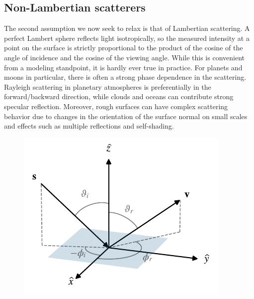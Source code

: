 \documentclass[modern]{aastex62}
\begin{document}
\subsection{Non-Lambertian scatterers}
\label{sec:nonlambertian}

The second assumption we now seek to relax is that of Lambertian
scattering. A perfect Lambert sphere reflects light isotropically, so
the measured intensity at a point on the surface is strictly
proportional to the product of the cosine of the angle of incidence
and the cosine of the viewing angle. While this is convenient
from a modeling standpoint, it is hardly ever true in practice.
For planets and moons in particular, there is often a strong phase
dependence in the scattering. Rayleigh scattering in planetary
atmospheres is preferentially in the forward/backward direction,
while clouds and oceans can contribute strong specular reflection.
Moreover, rough surfaces can have complex scattering behavior due
to changes in the orientation of the surface normal on small scales
and effects such as multiple reflections and self-shading.

\begin{figure}[t!]
    \begin{centering}
        \includegraphics[width=0.5\linewidth]{figures/scattering.pdf}
    \end{centering}
\end{figure}
\end{document}
